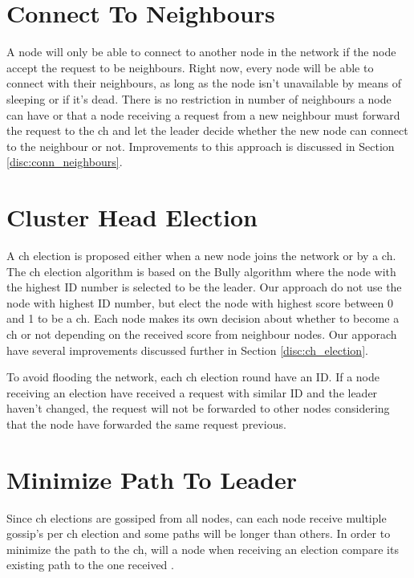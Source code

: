 \documentclass[USenglish]{uit-thesis}
\begin{document}
\section{Connect To Neighbours}
A node will only be able to connect to another node in the network if the node accept the request to be neighbours. Right now, every node will be able to connect with their neighbours, as long as the node isn't unavailable by means of sleeping or if it's dead. There is no restriction in number of neighbours a node can have or that a node receiving a request from a new neighbour must forward the request to the \gls{ch} and let the leader decide whether the new node can connect to the neighbour or not. Improvements to this approach is discussed in Section \ref{disc:conn_neighbours}.


\section{Cluster Head Election} \label{imp:ch_election}

A \gls{ch} election is proposed either when a new node joins the network or by a \gls{ch}. 
The \gls{ch} election algorithm is based on the Bully algorithm where the node with the highest ID number is selected to be the leader. Our approach do not use the node with highest ID number, but elect the node with highest score between 0 and 1 to be a \gls{ch}. Each node makes its own decision about whether to become a \gls{ch} or not depending on the received score from neighbour nodes.
Our apporach have several improvements discussed further in Section \ref{disc:ch_election}. 

To avoid flooding the network, each \gls{ch} election round have an ID. If a node receiving an election have received a request with similar ID and the leader haven't changed, the request will not be forwarded to other nodes considering that the node have forwarded the same request previous.


\section{Minimize Path To Leader}
Since \gls{ch} elections are gossiped from all nodes, can each node receive multiple gossip's per \gls{ch} election and some paths will be longer than others. In order to minimize the path to the \gls{ch}, will a node when receiving an election compare its existing path to the one received \cite{dijkstra}.
\end{document}
